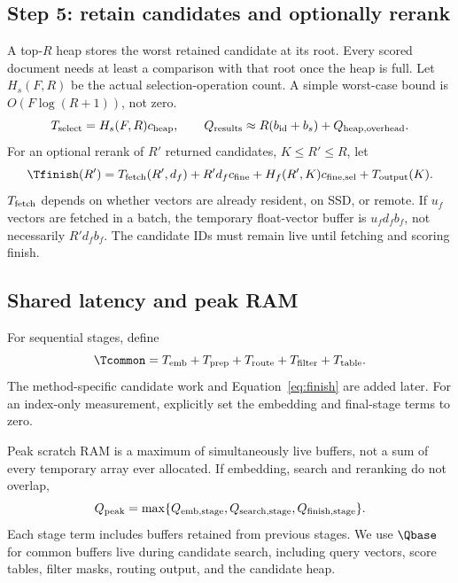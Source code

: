 \subsection{Step 5: retain candidates and optionally rerank}
A top-$R$ heap stores the worst retained candidate at its root. Every scored document needs
at least a comparison with that root once the heap is full. Let $H_s(F,R)$ be the actual
selection-operation count. A simple worst-case bound is $O(F\log(R+1))$, not zero.
\begin{equation}
T_{\rm select}=H_s(F,R)c_{\rm heap},\qquad
Q_{\rm results}\approx R(b_{\rm id}+b_s)+Q_{\rm heap,overhead}.
\label{eq:selection}
\end{equation}
For an optional rerank of $R'$ returned candidates, $K\leq R'\leq R$, let
\begin{equation}
\Tfinish(R')=T_{\rm fetch}(R',d_f)+R'd_f c_{\rm fine}
              +H_f(R',K)c_{\rm fine,sel}+T_{\rm output}(K).
\label{eq:finish}
\end{equation}
$T_{\rm fetch}$ depends on whether vectors are already resident, on SSD, or remote. If $u_f$
vectors are fetched in a batch, the temporary float-vector buffer is $u_f d_f b_f$, not
necessarily $R'd_f b_f$. The candidate IDs must remain live until fetching and scoring finish.

\subsection{Shared latency and peak RAM}
For sequential stages, define
\begin{equation}
\Tcommon=T_{\rm emb}+T_{\rm prep}+T_{\rm route}+T_{\rm filter}+T_{\rm table}.
\label{eq:common-time}
\end{equation}
The method-specific candidate work and Equation~\eqref{eq:finish} are added later. For an
index-only measurement, explicitly set the embedding and final-stage terms to zero.

Peak scratch RAM is a maximum of simultaneously live buffers, not a sum of every temporary
array ever allocated. If embedding, search and reranking do not overlap,
\begin{equation}
Q_{\rm peak}=\max\{Q_{\rm emb,stage},Q_{\rm search,stage},Q_{\rm finish,stage}\}.
\label{eq:peak}
\end{equation}
Each stage term includes buffers retained from previous stages. We use $\Qbase$ for common
buffers live during candidate search, including query vectors, score tables, filter masks,
routing output, and the candidate heap.

